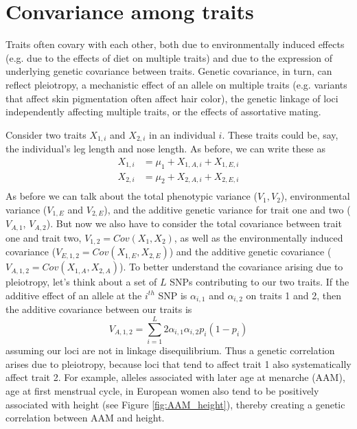 \section{Convariance among traits}
Traits often covary with each other, both due to environmentally
induced effects (e.g. due to the effects of diet on multiple traits)
and due to the expression of underlying genetic covariance between
traits. Genetic covariance, in turn, can reflect pleiotropy, a
mechanistic effect of an allele on multiple traits (e.g. variants that
affect skin pigmentation often affect hair color), the genetic
linkage of loci independently affecting multiple traits, or the
effects of assortative mating. 

Consider two traits $X_{1,i}$ and $X_{2,i}$ in an individual $i$. These traits could be,
say, the individual's leg length and nose length. As before, we can write
these as 
\begin{eqnarray}
X_{1,i} &= \mu_1+ X_{1,A,i} + X_{1,E,i}  \nonumber \\
X_{2,i} &= \mu_2 +X_{2,A,i} + X_{2,E,i} \nonumber \\
\end{eqnarray}
As before we can talk about the total phenotypic variance ($V_1,V_2$),
environmental variance  ($V_{1,E}$ and $V_{2,E}$), and the additive genetic variance for trait one and two ($V_{A,1}$, $V_{A,2}$). But now we also have to consider the 
total covariance between trait one and trait two, $V_{1,2}=Cov(X_{1},X_{2})$, as well as the environmentally induced covariance ($V_{E,1,2}=Cov(X_{1,E}
,X_{2,E} )$) and the additive genetic covariance ($V_{A,1,2}
=Cov(X_{1,A} ,X_{2,A} )$). To better understand the covariance arising due to pleiotropy, let's think about a set of $L$ SNPs contributing to our two traits. If the additive effect of an allele at the $i^{th}$ SNP is $\alpha_{i,1}$ and $\alpha_{i,2}$ on traits 1 and 2, then the additive covariance between our traits is
\begin{equation}
V_{A,1,2} = \sum_{i=1}^L 2\alpha_{i,1}\alpha_{i,2} p_i(1-p_i)
\end{equation}
assuming our loci are not in linkage disequilibrium. Thus a genetic
correlation arises due to pleiotropy, because loci that tend to affect
trait 1 also systematically affect trait 2. For example, alleles
associated with later age at menarche (AAM), age at first menstrual cycle, in European women also
tend to be positively associated with height (see Figure
\ref{fig:AAM_height}), thereby creating a genetic correlation between
AAM and height. 

